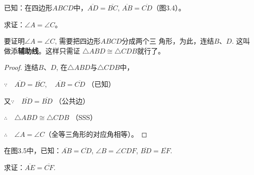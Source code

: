 \begin{figure}[htp]\centering
    \begin{minipage}[t]{0.48\textwidth}
    \centering
{}
    \caption{}
    \end{minipage}
    \begin{minipage}[t]{0.48\textwidth}
    \centering
    \caption{}
    \end{minipage}
    \end{figure}


\begin{example}
    已知：在四边形$ABCD$中，$\overline{AD}=\overline{BC}$,
$\overline{AB}=\overline{CD}$（图3.4）。

求证：$\angle A=\angle C$。
\end{example}

\begin{analyze}
    要证明$\angle A=\angle C$, 
需要把四边形$ABCD$分成两个三
角形，为此，连结$B$、$D$. 这叫
做添\textbf{辅助线}。这样只需证
$\triangle ABD\cong \triangle CDB$就行了。
\end{analyze}

\begin{proof}
连结$B$、$D$, 在$\triangle ABD$与$\triangle CDB$中，

$\because\quad \overline{AD}=\overline{BC},\quad \overline{AB}=\overline{CD}$ （已知）

又$\because\quad \overline{BD}=\overline{BD}$ （公共边）

$\therefore\quad \triangle ABD\cong \triangle CDB$ （SSS）

$\therefore\quad \angle A=\angle C$（全等三角形的对应角相等）。
\end{proof}    

\begin{example}
在图3.5中，已知：$\overline{AB}=\overline{CD}$, $\angle B=\angle CDF$, $\overline{BD}=\overline{EF}$.

求证：$\overline{AE}=\overline{CF}$.
\end{example}

